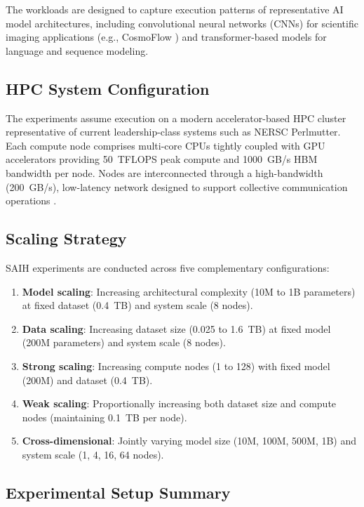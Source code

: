 \documentclass{llncs}
\begin{document}
The workloads are designed to capture execution patterns of representative AI model architectures, including convolutional neural networks (CNNs) for scientific imaging applications (e.g., CosmoFlow \cite{Mathuriya2018CosmoFlow}) and transformer-based models for language and sequence modeling.

\subsection{HPC System Configuration}

The experiments assume execution on a modern accelerator-based HPC cluster representative of current leadership-class systems such as NERSC Perlmutter. Each compute node comprises multi-core CPUs tightly coupled with GPU accelerators providing 50~TFLOPS peak compute and 1000~GB/s HBM bandwidth per node. Nodes are interconnected through a high-bandwidth (200~GB/s), low-latency network designed to support collective communication operations \cite{Gropp2014}.

\subsection{Scaling Strategy}

SAIH experiments are conducted across five complementary configurations:

\begin{enumerate}
    \item \textbf{Model scaling}: Increasing architectural complexity (10M to 1B parameters) at fixed dataset (0.4~TB) and system scale (8 nodes).
    \item \textbf{Data scaling}: Increasing dataset size (0.025 to 1.6~TB) at fixed model (200M parameters) and system scale (8 nodes).
    \item \textbf{Strong scaling}: Increasing compute nodes (1 to 128) with fixed model (200M) and dataset (0.4~TB).
    \item \textbf{Weak scaling}: Proportionally increasing both dataset size and compute nodes (maintaining 0.1~TB per node).
    \item \textbf{Cross-dimensional}: Jointly varying model size (10M, 100M, 500M, 1B) and system scale (1, 4, 16, 64 nodes).
\end{enumerate}

\subsection{Experimental Setup Summary}
\end{document}
